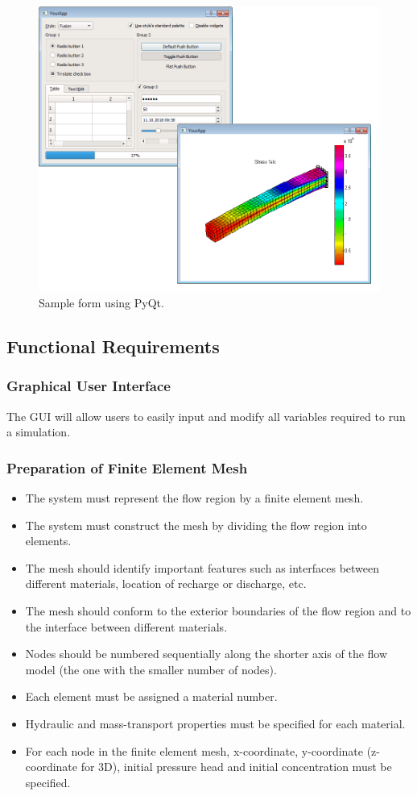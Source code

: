 \documentclass[draftclsnofoot,onecolumn,letterpaper,10pt,compsoc]{IEEEtran}
\begin{document}
\begin{figure}
\centering
\includegraphics[scale=0.8]{form.png}
\caption{Sample form using PyQt.}
\label{fig:form}
\end{figure}

\subsection{Functional Requirements}
\subsubsection{Graphical User Interface}
The GUI will allow users to easily input and modify all variables required to run a simulation.

\subsubsection{Preparation of Finite Element Mesh}
\begin{itemize}
    \item The system must represent the flow region by a finite element mesh.
    \item The system must construct the mesh by dividing the flow region into elements.
    \item The mesh should identify important features such as interfaces between different materials, location of recharge or discharge, etc.
    \item The mesh should conform to the exterior boundaries of the flow region and to the interface between different materials.
    \item Nodes should be numbered sequentially along the shorter axis of the flow model (the one with the smaller number of nodes).
    \item Each element must be assigned a material number.
    \item Hydraulic and mass-transport properties must be specified for each material.
    \item For each node in the finite element mesh, x-coordinate, y-coordinate (z-coordinate for 3D), initial pressure head and initial concentration must be specified.
\end{itemize}
\end{document}
